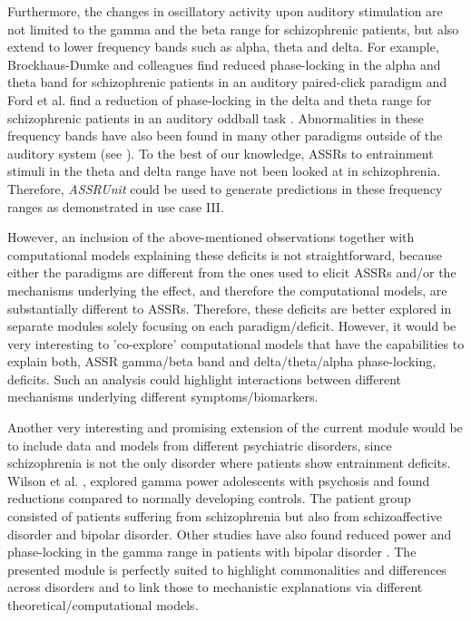 \documentclass[a4paper,10pt]{article}
\begin{document}
Furthermore, the changes in oscillatory activity upon auditory stimulation are not limited to the gamma and the beta range for schizophrenic patients, but also extend to lower frequency bands such as alpha, theta and delta.
For example, Brockhaus-Dumke and colleagues find reduced phase-locking in the alpha and theta band for schizophrenic patients in an auditory paired-click paradigm \cite{Brockhaus2008} and Ford et al. find a
reduction of phase-locking in the delta and theta range for schizophrenic patients in an auditory oddball task \cite{Ford2008}. Abnormalities in these frequency bands have also been found in many other paradigms outside of
the auditory system (see \cite{Basar2013}). To the best of our knowledge, ASSRs to entrainment stimuli in the theta and delta range have not been looked at in schizophrenia. Therefore, \textit{ASSRUnit} could be 
used to generate predictions in these frequency ranges as demonstrated in use case III.

However, an inclusion of the above-mentioned observations together with computational models explaining these deficits is not straightforward, because either the paradigms are different from the ones
used to elicit ASSRs and/or the mechanisms underlying the effect, and therefore the computational models, are substantially different to ASSRs. Therefore, these deficits are better explored in separate modules solely focusing
on each paradigm/deficit. However, it would be very interesting to 'co-explore' computational models that have the capabilities to explain both, ASSR gamma/beta band and delta/theta/alpha phase-locking, deficits. Such an analysis 
could highlight interactions between different mechanisms underlying different symptoms/biomarkers.

Another very interesting and promising extension of the current module would be to include data and models from different psychiatric disorders, since schizophrenia is not the only disorder
where patients show entrainment deficits. Wilson et al. \cite{Wilson2007}, explored gamma power adolescents with psychosis and found reductions compared to normally developing controls. The patient group
consisted of patients suffering from schizophrenia but also from schizoaffective disorder and bipolar disorder. Other studies have also found reduced power and phase-locking in the gamma range in patients 
with bipolar disorder \cite{ODonnell2004,Spencer2008,Rass2010}.
The presented module is perfectly suited to highlight commonalities and differences across disorders and to link those to mechanistic 
explanations via different theoretical/computational models.
\end{document}
